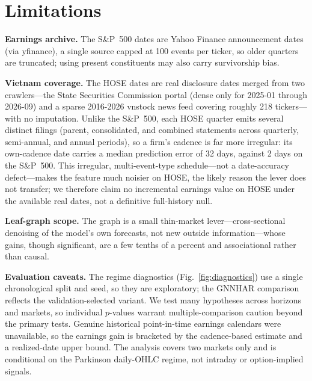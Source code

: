 \documentclass[runningheads]{llncs}
\begin{document}
\FloatBarrier
\section{Limitations}
\noindent\textbf{Earnings archive.} The S\&P~500 dates are Yahoo Finance announcement dates (via
yfinance), a single source capped at 100 events per ticker, so older quarters are truncated; using present
constituents may also carry survivorship bias.

\noindent\textbf{Vietnam coverage.} The HOSE dates are real disclosure dates merged from two crawlers---the
State Securities Commission portal (dense only for 2025-01 through 2026-09) and a sparse 2016-2026 vnstock
news feed covering roughly 218 tickers---with no imputation. Unlike the S\&P~500, each HOSE quarter emits
several distinct filings (parent, consolidated, and combined statements across quarterly, semi-annual, and
annual periods), so a firm's cadence is far more irregular: its own-cadence date carries a median
prediction error of 32 days, against 2 days on the S\&P~500. This irregular, multi-event-type
schedule---not a date-accuracy defect---makes the feature much noisier on HOSE, the likely reason the lever
does not transfer; we therefore claim no incremental earnings value on HOSE under the available real dates,
not a definitive full-history null.

\noindent\textbf{Leaf-graph scope.} The graph is a small thin-market lever---cross-sectional denoising of
the model's own forecasts, not new outside information---whose gains, though significant, are a few tenths
of a percent and associational rather than causal.

\noindent\textbf{Evaluation caveats.} The regime diagnostics (Fig.~\ref{fig:diagnostics}) use a single
chronological split and seed, so they are exploratory; the GNNHAR comparison reflects the
validation-selected variant. We test many hypotheses across horizons and markets, so individual $p$-values
warrant multiple-comparison caution beyond the primary tests. Genuine historical point-in-time earnings
calendars were unavailable, so the earnings gain is bracketed by the cadence-based estimate and a
realized-date upper bound. The analysis covers two markets only and is conditional on the Parkinson
daily-OHLC regime, not intraday or option-implied signals.
\end{document}
